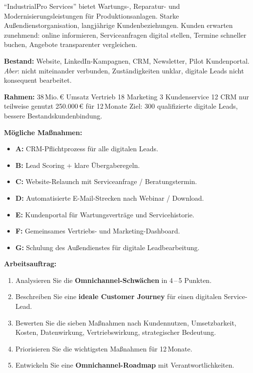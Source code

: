 \documentclass[11pt,a4paper,oneside]{article}
\begin{document}
\begin{infobox}
``IndustrialPro Services'' bietet Wartungs-, Reparatur- und Modernisierungsleistungen für Produktionsanlagen. Starke Außendienstorganisation, langjährige Kundenbeziehungen. Kunden erwarten zunehmend: online informieren, Serviceanfragen digital stellen, Termine schneller buchen, Angebote transparenter vergleichen.

\smallskip
\textbf{Bestand:} Website, LinkedIn-Kampagnen, CRM, Newsletter, Pilot Kundenportal. \emph{Aber}: nicht miteinander verbunden, Zuständigkeiten unklar, digitale Leads nicht konsequent bearbeitet.

\smallskip
\textbf{Rahmen:} 38\,Mio.\,\euro{} Umsatz \textperiodcentered{} Vertrieb 18 \textperiodcentered{} Marketing 3 \textperiodcentered{} Kundenservice 12 \textperiodcentered{} CRM nur teilweise genutzt \textperiodcentered{} 250.000\,\euro{} für 12\,Monate \textperiodcentered{} Ziel: 300 qualifizierte digitale Leads, bessere Bestandskundenbindung.

\smallskip
\textbf{Mögliche Maßnahmen:}
\begin{itemize}
  \item \textbf{A:} CRM-Pflichtprozess für alle digitalen Leads.
  \item \textbf{B:} Lead Scoring + klare Übergaberegeln.
  \item \textbf{C:} Website-Relaunch mit Serviceanfrage / Beratungstermin.
  \item \textbf{D:} Automatisierte E-Mail-Strecken nach Webinar / Download.
  \item \textbf{E:} Kundenportal für Wartungsverträge und Servicehistorie.
  \item \textbf{F:} Gemeinsames Vertriebs- und Marketing-Dashboard.
  \item \textbf{G:} Schulung des Außendienstes für digitale Leadbearbeitung.
\end{itemize}
\end{infobox}

\noindent\textbf{Arbeitsauftrag:}

\begin{enumerate}
  \item Analysieren Sie die \textbf{Omnichannel-Schwächen} in 4\,--\,5 Punkten.
  \item Beschreiben Sie eine \textbf{ideale Customer Journey} für einen digitalen Service-Lead.
  \item Bewerten Sie die sieben Maßnahmen nach Kundennutzen, Umsetzbarkeit, Kosten, Datenwirkung, Vertriebswirkung, strategischer Bedeutung.
  \item Priorisieren Sie die wichtigsten Maßnahmen für 12\,Monate.
  \item Entwickeln Sie eine \textbf{Omnichannel-Roadmap} mit Verantwortlichkeiten.
\end{enumerate}
\end{document}
